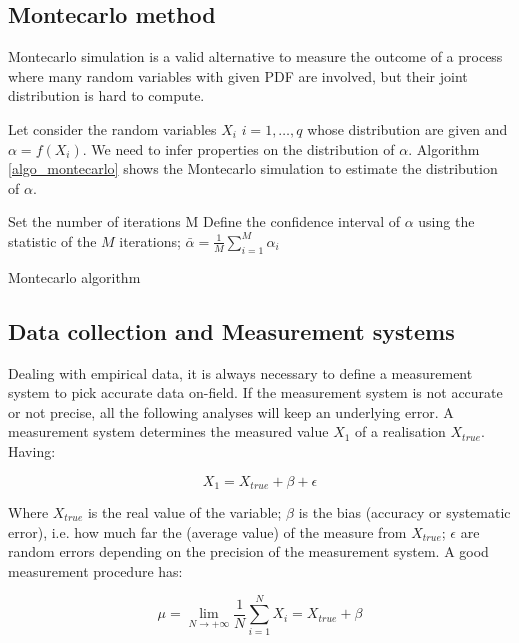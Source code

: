 \subsection{Montecarlo method}
Montecarlo simulation is a valid alternative to measure the outcome of a process where many random variables with given PDF are involved, but their joint distribution is hard to compute. \par

Let consider the random variables $X_i$ $i=1,\ldots,q$ whose distribution are given and $\alpha=f(X_i)$. We need to infer properties on the distribution of $\alpha$. Algorithm \ref{algo_montecarlo} shows the Montecarlo simulation to estimate the distribution of $\alpha$. 

\begin{algorithm}[H]
\DontPrintSemicolon
\SetAlgoLined
Set the number of iterations M\;
Define the confidence interval of $\alpha$ using the statistic of the $M$ iterations; $\bar{\alpha}=\frac{1}{M}\sum_{i=1}^{M}\alpha_i$ \;
\caption{Montecarlo algorithm}
\label{algo_montecarlo}
\end{algorithm}

\subsection{Data collection and Measurement systems} \label{secMeasurementSystem}
Dealing with empirical data, it is always necessary to define a measurement system to pick accurate data on-field. If the measurement system is not accurate or not precise, all the following analyses will keep an underlying error. A measurement system determines the measured value $X_1$ of a realisation $X_{true}$. Having:

\begin{equation}
X_1=X_{true}+\beta+\epsilon
\label{eq_measurement1}
\end{equation}

Where $X_{true}$ is the real value of the variable; $\beta$ is the bias (accuracy or systematic error), i.e. how much far the (average value) of the measure from $X_{true}$; $\epsilon$ are random errors depending on the precision of the measurement system. A good measurement procedure has:

\begin{equation}
\mu=\lim_{N \to +\infty}{\frac{1}{N}\sum_{i=1}^{N}{X_i=X_{true}+\beta}}
\label{eq_measurement2}
\end{equation}

